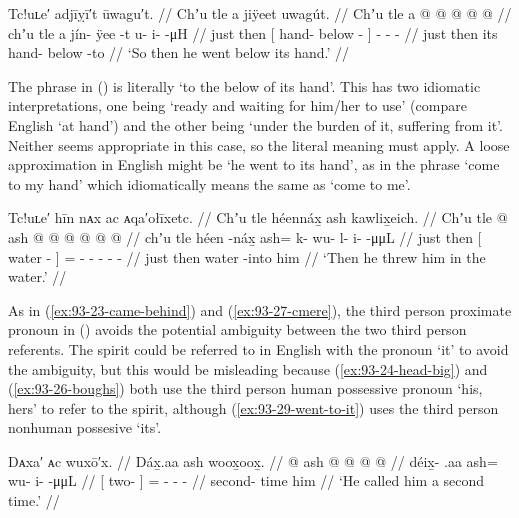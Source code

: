 \ex\label{ex:93-29-went-to-it}%
%
\begingl
	\glpreamble	Tc!uʟe′ adjīỵī′t ūwagu′t. //
	\glpreamble	Chʼu tle a jiÿeet uwagút. //
	\gla	Chʼu tle {} a  @ {} @ {} {}
		 @ {} @ {} @ {} //
	\glb	chʼu tle {} a jín- ÿee -t {} 
		u- i-  -μH //
	\glc	just then {}[  hand- below - {}]
		- -  - //
	\gld	just then {} its hand- below -to {}
		 {} {} {} //
	\glft	‘So then he went below its hand.’
		//
\endgl
\xe

The phrase  in (\lastx) is literally ‘to the below of its hand’.
This has two idiomatic interpretations, one being ‘ready and waiting for him/her to use’ (compare English ‘at hand’) and the other being ‘under the burden of it, suffering from it’.
Neither seems appropriate in this case, so the literal meaning must apply.
A loose approximation in English might be ‘he went to its hand’, as in the phrase ‘come to my hand’ which idiomatically means the same as ‘come to me’.

\ex\label{ex:93-30-threw-in-water}%
%
\begingl
	\glpreamble	Tc!uʟe′ hīn nᴀx ac ᴀqa′ołīxetc. //
	\glpreamble	Chʼu tle héennáx̱ ash kawlix̱eich. //
	\gla	Chʼu tle {}  @ {} {}
		ash @  @ {} @ {} @ {} @ {} @ {} //
	\glb	chʼu tle {} héen -náx̱ {}
		ash= k- wu- l- i-  -μμL //
	\glc	just then {}[ water - {}]
		= - - - -  - //
	\gld	just then {} water -into {}
		him  {} {} {} {} {} //
	\glft	‘Then he threw him in the water.’
		//
\endgl
\xe

As in (\ref{ex:93-23-came-behind}) and (\ref{ex:93-27-cmere}), the third person proximate pronoun in (\lastx) avoids the potential ambiguity between the two third person referents.
The spirit could be referred to in English with the pronoun ‘it’ to avoid the ambiguity, but this would be misleading because (\ref{ex:93-24-head-big}) and (\ref{ex:93-26-boughs}) both use the third person human possessive pronoun  ‘his, hers’ to refer to the spirit, although (\ref{ex:93-29-went-to-it}) uses the third person nonhuman possesive  ‘its’.

\ex\label{ex:93-31-second-time}%
%
\begingl
	\glpreamble	Dᴀxa′ ᴀc wuxō′x. //
	\glpreamble	Dáx̱.aa ash woox̱oox̱. //
	\gla	{}  @ {} {} ash @  @ {} @ {} @ {} //
	\glb	{} déix̱- .aa {} ash= wu- i-  -μμL //
	\glc	{}[ two-  {}] = - -  - //
	\gld	{} second- time {} him  {} {} {} //
	\glft	‘He called him a second time.’
		//
\endgl
\xe

